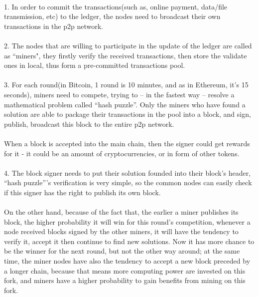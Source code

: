 \documentclass[]{article}
\begin{document}
\begin{CJK*}{UTF8}{gbsn}
	\paragraph{}    
    1. In order to commit the transactions(such as, online payment, data/file transmission, etc) to the ledger, the nodes need to broadcast their own transactions in the p2p network.
    \paragraph{}
    2. The nodes that are willing to participate in the update of the ledger are called as ``miners", they firstly verify the received transactions, then store the validate ones in local, thus form a pre-committed transactions pool.
    \paragraph{}
    3. For each round(in Bitcoin, 1 round is 10 minutes, and as in Ethereum, it’s 15 seconds), miners need to compete, trying to – in the fastest way – resolve a mathematical problem called “hash puzzle”. Only the miners who have found a solution are able to package their transactions in the pool into a block, and sign, publish, broadcast this block to the entire p2p network.
    \paragraph{} 
     When a block is accepted into the main chain, then the signer could get rewards for it -  it could be an amount of cryptocurrencies, or in form of other tokens.
    \paragraph{}    
    4. The block signer needs to put their solution founded into their block’s header, “hash puzzle”’s verification is very simple, so the common nodes can easily check if this signer has the right to publish its own block.
    \paragraph{}
    On the other hand, because of the fact that, the earlier a miner publishes its block, the higher probability it will win for this round’s competition, whenever a node received blocks signed by the other miners, it will have the tendency to verify it, accept it then continue to find new solutions. Now it has more chance to be the winner for the next round, but not the other way around; at the same time, the miner nodes have also the tendency to accept a new block preceded by a longer chain, because that means more computing power are invested on this fork, and miners have a higher probability to gain benefits from mining on this fork.

\end{CJK*}
\end{document}
